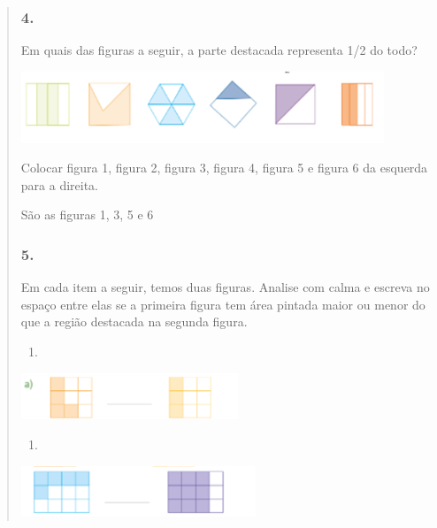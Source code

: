 \begin{enumerate}
\begin{escolha}
\begin{enumerate}
\begin{itemize}
\begin{itemize}
\begin{escolha}
\begin{quote}
\begin{escolha}
{\subsubsection{4. }\label{section-107}

Em quais das figuras a seguir, a parte destacada representa 1/2 do todo?

\includegraphics[width=4.27537in,height=0.84174in]{media/image107.png}

Colocar figura 1, figura 2, figura 3, figura 4, figura 5 e figura 6 da
esquerda para a direita.

São as figuras 1, 3, 5 e 6

\subsubsection{5. }\label{section-108}

Em cada item a seguir, temos duas figuras. Analise com calma e escreva no espaço
entre elas se a primeira figura tem área pintada maior ou menor do que a
região destacada na segunda figura.


\begin{enumerate}
\def\labelenumi{\alph{enumi})}
\item
\end{enumerate}

\includegraphics[width=2.55022in,height=0.55005in]{media/image108.png}

\begin{enumerate}
\def\labelenumi{\alph{enumi})}
\item
\end{enumerate}

\includegraphics[width=2.75857in,height=0.60005in]{media/image109.png}

}
\end{escolha}
\end{quote}
\end{escolha}
\end{itemize}
\end{itemize}
\end{enumerate}
\end{escolha}
\end{enumerate}
